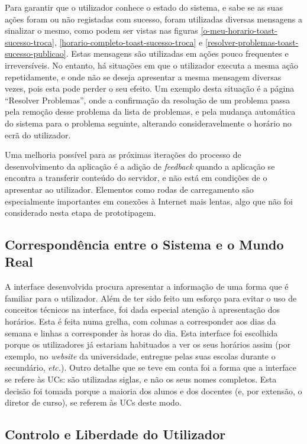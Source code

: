 \documentclass[12pt, a4paper]{article}
\begin{document}
Para garantir que o utilizador conhece o estado do sistema, e sabe se as suas ações foram ou não
registadas com sucesso, foram utilizadas diversas mensagens a sinalizar o mesmo, como podem ser
vistas nas figuras \ref{o-meu-horario-toast-sucesso-troca},
\ref{horario-completo-toast-sucesso-troca} e \ref{resolver-problemas-toast-sucesso-publicao}. Estas
mensagens são utilizadas em ações pouco frequentes e irreversíveis. No entanto, há situações em que
o utilizador executa a mesma ação repetidamente, e onde não se deseja apresentar a mesma mensagem
diversas vezes, pois esta pode perder o seu efeito. Um exemplo desta situação é a página
``Resolver Problemas'', onde a confirmação da resolução de um problema passa pela remoção desse
problema da lista de problemas, e pela mudança automática do sistema para o problema seguinte,
alterando consideravelmente o horário no ecrã do utilizador.

Uma melhoria possível para as próximas iterações do processo de desenvolvimento da aplicação é a
adição de \emph{feedback} quando a aplicação se encontra a transferir conteúdo do servidor, e não
está em condições de o apresentar ao utilizador. Elementos como rodas de carregamento são
especialmente importantes em conexões à Internet mais lentas, algo que não foi considerado nesta
etapa de prototipagem.

\subsection{Correspondência entre o Sistema e o Mundo Real}

A interface desenvolvida procura apresentar a informação de uma forma que é familiar para o
utilizador. Além de ter sido feito um esforço para evitar o uso de conceitos técnicos na interface,
foi dada especial atenção à apresentação dos horários. Esta é feita numa grelha, com colunas a
corresponder aos dias da semana e linhas a corresponder às horas do dia. Esta interface foi
escolhida porque os utilizadores já estariam habituados a ver os seus horários assim (por exemplo,
no \emph{website} da universidade, entregue pelas suas escolas durante o secundário, \emph{etc.}).
Outro detalhe que se teve em conta foi a forma que a interface se refere às UCs: são utilizadas
siglas, e não os seus nomes completos. Esta decisão foi tomada porque a maioria dos alunos e dos
docentes (e, por extensão, o diretor de curso), se referem às UCs deste modo.

\subsection{Controlo e Liberdade do Utilizador}
\end{document}
